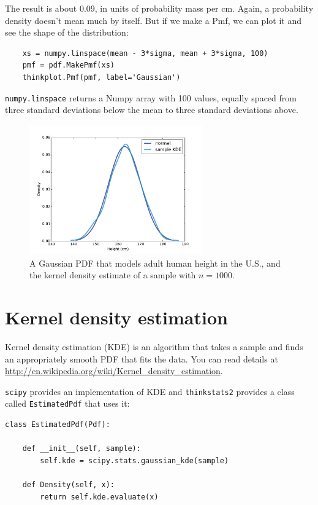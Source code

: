 \documentclass[12pt]{book}
\begin{document}
The result is about 0.09, in units of probability mass per cm.
Again, a probability density doesn't mean much by itself.  But if
we make a Pmf, we can plot it and see the shape of the distribution:

\begin{verbatim}
    xs = numpy.linspace(mean - 3*sigma, mean + 3*sigma, 100)
    pmf = pdf.MakePmf(xs)
    thinkplot.Pmf(pmf, label='Gaussian')
\end{verbatim}

{\tt numpy.linspace} returns a Numpy array with 100 values, equally
spaced from three standard deviations below the mean to three standard
deviations above.

\begin{figure}
\centerline{\includegraphics[height=2.2in]{figs/pdf_example.pdf}}
\caption{A Gaussian PDF that models adult human height in the U.S.,
and the kernel density estimate of a sample with $n=1000$.}
\label{pdf_example}
\end{figure}


\section{Kernel density estimation} 

Kernel density estimation (KDE) is an algorithm that takes
a sample and finds an appropriately smooth PDF that fits 
the data.  You can read details at
\url{http://en.wikipedia.org/wiki/Kernel_density_estimation}.

{\tt scipy} provides an implementation of KDE and {\tt thinkstats2}
provides a class called {\tt EstimatedPdf} that uses it:

\begin{verbatim}
class EstimatedPdf(Pdf):

    def __init__(self, sample):
        self.kde = scipy.stats.gaussian_kde(sample)

    def Density(self, x):
        return self.kde.evaluate(x)
\end{verbatim}
\end{document}
